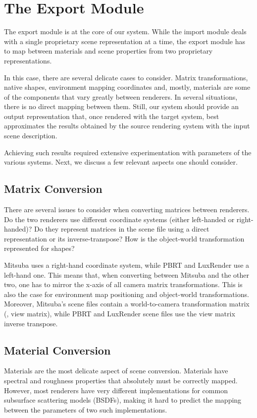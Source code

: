 

\section{The Export Module}

The export module is at the core of our system. While the import module deals with a single proprietary scene representation at a time, the export module has to map between materials and scene properties from two proprietary representations. 

In this case, there are several delicate cases to consider. Matrix transformations, native shapes, environment mapping coordinates and, mostly, materials are
some of the components that vary greatly between renderers. In several situations, there is no direct mapping between them. Still, our system should provide an output representation that, once rendered with the target system, best approximates the results obtained by the source rendering system with the input scene description. 

Achieving such results required extensive experimentation with parameters of the various systems. Next, we discuss a few relevant aspects one should consider.    
  
\subsection{Matrix Conversion}
There are several issues to consider when converting matrices between renderers. Do the two renderers use different coordinate systems (either left-handed or right-handed)? Do they represent matrices in the scene file using a direct representation or its inverse-transpose? How is the object-world transformation represented for shapes?

Mitsuba uses a right-hand coordinate system, while PBRT and LuxRender use a left-hand one. This means that, when converting between Mitsuba and the other
two, one has to mirror the x-axis of all camera matrix transformations. This is also the case for environment map positioning and object-world transformations. Moreover, Mitsuba's scene files contain a world-to-camera transformation matrix (\ie, view matrix), while PBRT and LuxRender scene files use the view matrix inverse transpose.

\subsection{Material Conversion}
Materials are the most delicate aspect of scene conversion. Materials have spectral and roughness properties that absolutely must be correctly mapped. 
However, most renderers have very different implementations for common subsurface scattering models (BSDFs), making it hard to predict the mapping between the parameters of two such implementations.

